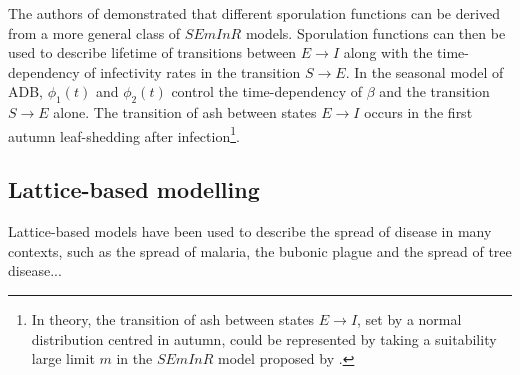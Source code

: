 The authors of \cite{time-varying-infectivity} demonstrated that different sporulation functions can be derived from a more general class of $SEmInR$ models. 
Sporulation functions can then be used to describe lifetime of transitions between $E\rightarrow I$ along with the time-dependency of infectivity rates in the transition $S\rightarrow E$. 
In the seasonal model of ADB, $\phi_1(t)$ and $\phi_2(t)$ control the time-dependency of $\beta$ and the transition $S\rightarrow E$ alone.
The transition of ash between states $E\rightarrow I$ occurs in the first autumn leaf-shedding after infection\footnote{In theory, the transition of ash between states $E\rightarrow I$, set by a normal distribution centred in autumn, could be represented by taking a suitability large limit $m$ in the $SEmInR$ model proposed by \cite{time-varying-infectivity}.}. 





%
\subsection{Lattice-based modelling}
Lattice-based models have been used to describe the spread of disease in many contexts, such as the spread of malaria, the bubonic plague and the spread of tree disease...

